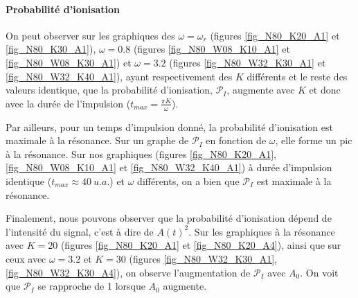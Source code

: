 \documentclass{report}
\begin{document}
\paragraph{Probabilité d'ionisation}

On peut observer sur les graphiques des $\omega = \omega_{r}$ (figures \ref{fig_N80_K20_A1} et \ref{fig_N80_K30_A1}), $\omega = 0.8$ (figures \ref{fig_N80_W08_K10_A1} et \ref{fig_N80_W08_K30_A1}) et $\omega = 3.2$ (figures \ref{fig_N80_W32_K30_A1} et \ref{fig_N80_W32_K40_A1}), ayant respectivement des $K$ différents et le reste des valeurs identique, que la probabilité d'ionisation, $\mathcal{P}_{I}$, augmente avec $K$ et donc avec la durée de l'impulsion ($t_{max}= \frac{\pi K}{\omega}$).

Par ailleurs, pour un temps d'impulsion donné, la probabilité d'ionisation est maximale à la résonance. Sur un graphe de $\mathcal{P}_{I}$ en fonction de $\omega$, elle forme un pic à la résonance. Sur nos graphiques (figures \ref{fig_N80_K20_A1}, \ref{fig_N80_W08_K10_A1} et \ref{fig_N80_W32_K40_A1}) à durée d'impulsion identique ($t_{max} \approx 40\ u.a.$) et $\omega$ différents, on a bien que $\mathcal{P}_{I}$ est maximale à la résonance. 

Finalement, nous pouvons observer que la probabilité d'ionisation dépend de l'intensité du signal, c'est à dire de $A(t)^2$. Sur les graphiques à la résonance avec $K=20$ (figures \ref{fig_N80_K20_A1} et \ref{fig_N80_K20_A4}), ainsi que sur ceux avec $\omega = 3.2$ et $K=30$ (figures \ref{fig_N80_W32_K30_A1}, \ref{fig_N80_W32_K30_A4}), on observe l'augmentation de $\mathcal{P}_{I}$ avec $A_0$. On voit que $\mathcal{P}_{I}$ se rapproche de 1 lorsque $A_0$ augmente.
\end{document}
